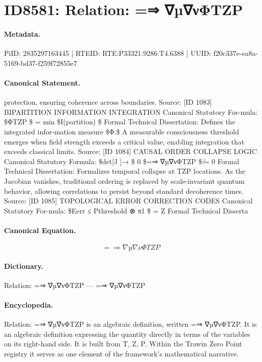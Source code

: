 \section*{ID8581: Relation: =⇒ ∇µ∇νΦTZP}
\paragraph{Metadata.}
PiID: 2835297163445 | RTEID: RTE:P33321.9286:T4.6388 | UUID: f20c337e-ea8a-5169-bd37-f259f72855e7

\paragraph{Canonical Statement.}
protection, ensuring coherence across boundaries. Source: [ID 1083] BIPARTITION INFORMATION INTEGRATION Canonical Statutory For-mula: \$ΦTZP \$ = min \$I(partition) \$ Formal Technical Dissertation: Defines the integrated infor-mation measure \$Φ.\$ A measurable consciousness threshold emerges when field strength exceeds a critical value, enabling integration that exceeds classical limits. Source: [ID 1084] CAUSAL ORDER COLLAPSE LOGIC Canonical Statutory Formula: \$det[J ]→ \$ 0 \$=⇒ ∇µ∇νΦTZP \$ ̸= 0 Formal Technical Dissertation: Formalizes temporal collapse at TZP locations. As the Jacobian vanishes, traditional ordering is replaced by scale-invariant quantum behavior, allowing correlations to persist beyond standard decoherence times. Source: [ID 1085] TOPOLOGICAL ERROR CORRECTION CODES Canonical Statutory For-mula: \$Eerr ≤ Pthreshold ⊗ π1 \$ = Z Formal Technical Disserta

\paragraph{Canonical Equation.}
\[
=⇒ ∇µ∇νΦTZP
\]

\paragraph{Dictionary.}
Relation: =⇒ ∇µ∇νΦTZP — =⇒ ∇µ∇νΦTZP

\paragraph{Encyclopedia.}
Relation: =⇒ ∇µ∇νΦTZP is an algebraic definition, written =⇒ ∇µ∇νΦTZP. It is an algebraic definition expressing the quantity directly in terms of the variables on its right-hand side. It is built from T, Z, P. Within the Trawin Zero Point registry it serves as one element of the framework's mathematical narrative.
